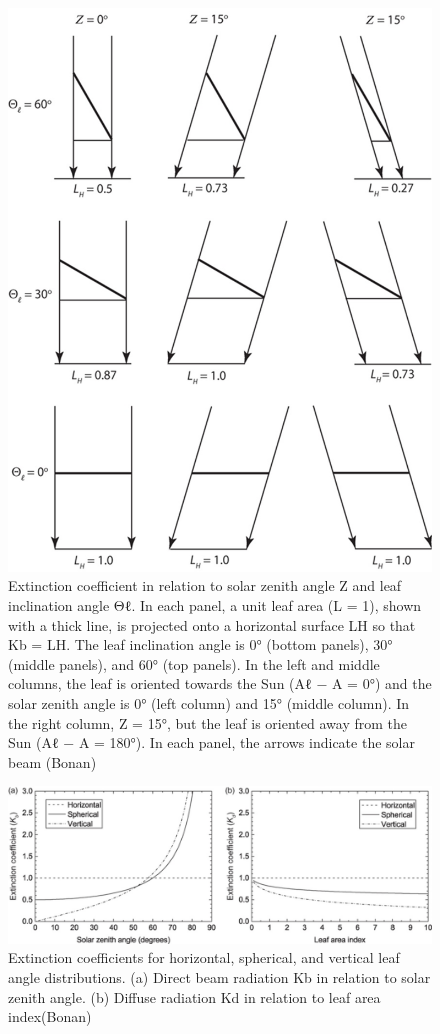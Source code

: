 \documentclass[12pt,oneside]{book}
\begin{document}
\begin{figure}

{\centering \includegraphics[width=0.8\linewidth]{figures/chap3/f311_LLh} 

}

\caption{Extinction coefficient in relation to solar zenith angle Ζ and leaf inclination angle Θℓ. In each panel, a unit leaf area (L = 1), shown with a thick line, is projected onto a horizontal surface LH so that Kb = LH. The leaf inclination angle is 0° (bottom panels), 30° (middle panels), and 60° (top panels). In the left and middle columns, the leaf is oriented towards the Sun (Αℓ − Α = 0°) and the solar zenith angle is 0° (left column) and 15° (middle column). In the right column, Ζ = 15°, but the leaf is oriented away from the Sun (Αℓ − Α = 180°). In each panel, the arrows indicate the solar beam (Bonan)}\label{fig:f311}
\end{figure}

\begin{figure}

{\centering \includegraphics[width=0.8\linewidth]{figures/chap3/f312_Kb_angle} 

}

\caption{Extinction coefficients for horizontal, spherical, and vertical leaf angle distributions. (a) Direct beam radiation Kb in relation to solar zenith angle. (b) Diffuse radiation Kd in relation to leaf area index(Bonan)}\label{fig:f312}
\end{figure}
\end{document}
